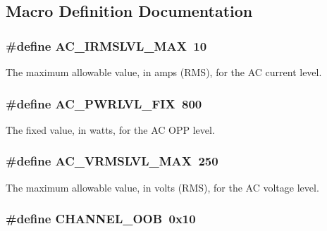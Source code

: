 \subsection{Macro Definition Documentation}
\hypertarget{a00043_a2b577413184eb560f2f652b11deeba87}{
\subsubsection[{A\-C\-\_\-\-I\-R\-M\-S\-L\-V\-L\-\_\-\-M\-A\-X}]{\setlength{\rightskip}{0pt plus 5cm}\#define A\-C\-\_\-\-I\-R\-M\-S\-L\-V\-L\-\_\-\-M\-A\-X~10}}\label{a00043_a2b577413184eb560f2f652b11deeba87}
The maximum allowable value, in amps (R\-M\-S), for the A\-C current level. \hypertarget{a00043_aa5433ef3bc07259bf870e6e5e115c693}{
\subsubsection[{A\-C\-\_\-\-P\-W\-R\-L\-V\-L\-\_\-\-F\-I\-X}]{\setlength{\rightskip}{0pt plus 5cm}\#define A\-C\-\_\-\-P\-W\-R\-L\-V\-L\-\_\-\-F\-I\-X~800}}\label{a00043_aa5433ef3bc07259bf870e6e5e115c693}
The fixed value, in watts, for the A\-C O\-P\-P level. \hypertarget{a00043_afb09d50c3567117fe1f679ab1924d4ec}{
\subsubsection[{A\-C\-\_\-\-V\-R\-M\-S\-L\-V\-L\-\_\-\-M\-A\-X}]{\setlength{\rightskip}{0pt plus 5cm}\#define A\-C\-\_\-\-V\-R\-M\-S\-L\-V\-L\-\_\-\-M\-A\-X~250}}\label{a00043_afb09d50c3567117fe1f679ab1924d4ec}
The maximum allowable value, in volts (R\-M\-S), for the A\-C voltage level. \hypertarget{a00043_a5f4c019658ca5a8eff4bfc3d96d489a0}{
\subsubsection[{C\-H\-A\-N\-N\-E\-L\-\_\-\-O\-O\-B}]{\setlength{\rightskip}{0pt plus 5cm}\#define C\-H\-A\-N\-N\-E\-L\-\_\-\-O\-O\-B~0x10}}\label{a00043_a5f4c019658ca5a8eff4bfc3d96d489a0}
